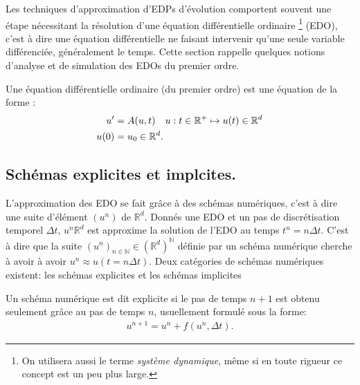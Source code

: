 Les techniques d'approximation d'EDPs d'évolution comportent souvent une étape nécessitant la résolution d'une équation différentielle ordinaire
\footnote{On utilisera aussi le terme \textit{système dynamique}, même si en toute rigueur ce concept est un peu plus large.} (EDO),
c'est à dire une équation différentielle ne faisant intervenir qu'une seule variable différenciée, généralement le temps. Cette section rappelle 
quelques notions d'analyse et de simulation des EDOs du premier ordre.\par

\begin{definition}
    Une équation différentielle ordinaire (du premier ordre) est une équation de la forme :
    \begin{align}\label{def:def_ODE}
        u' &= A(u,t)\quad u : t \in \mathbb{R}^+ \mapsto u(t) \in \mathbb{R}^d\\\notag
        u(0)&=u_0 \in \mathbb{R}^d.
    \end{align}
\end{definition}
\subsection{Schémas explicites et implcites.}
L'approximation des EDO se fait grâce à des schémas numériques, c'est à dire une suite d'élément $(u^n)$ de $\mathbb{R}^d$.
Donnés une EDO et un pas de discrétisation temporel $\Delta t$, $u^n \mathbb{R}^d$ est approxime la solution de l'EDO au temps $t^n = n \Delta t$.
C'est à dire que la suite $(u^n)_{n\in \mathbb{N}} \in (\mathbb R^d)^\mathbb{N}$ définie par un schéma numérique cherche à avoir à avoir $u^n \approx u(t=n\Delta t)$.
Deux catégories de schémas numériques existent: les schémas explicites et les schémas implicites


\begin{definition}
    Un schéma numérique est dit explicite si le pas de temps $n+1$ est obtenu seulement grâce au pas de temps $n$, usuellement formulé sous la forme:
    \begin{align}
        u^{n+1} = u^n + f(u^n ,\Delta t ).
    \end{align}
\end{definition}

